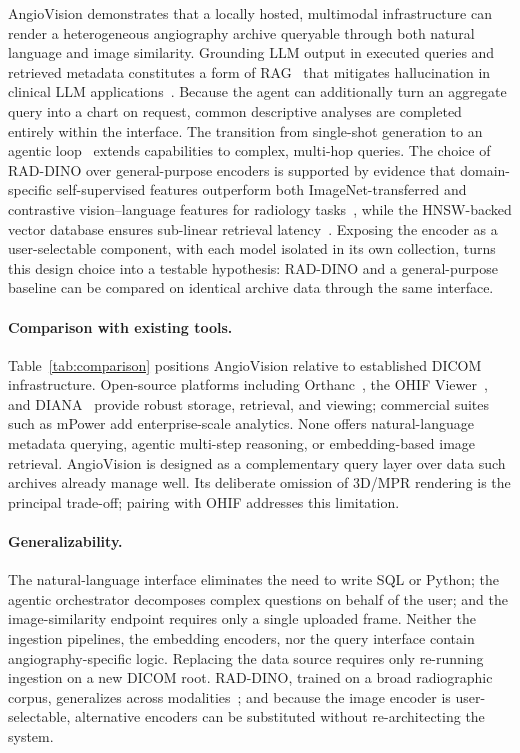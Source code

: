 \documentclass[11pt]{article}
\begin{document}
AngioVision demonstrates that a locally hosted, multimodal infrastructure can
render a heterogeneous angiography archive queryable through both natural
language and image similarity. Grounding LLM output in executed queries and
retrieved metadata constitutes a form of
RAG~\cite{lewis2020rag} that mitigates hallucination in clinical LLM
applications~\cite{thirunavukarasu2023llmmed,weinert2025rag}. Because the agent
can additionally turn an aggregate query into a chart on request, common
descriptive analyses are completed entirely within the interface. The transition
from single-shot generation to an agentic
loop~\cite{huggingface2025smolagents,yao2023react} extends capabilities to
complex, multi-hop queries. The choice of RAD-DINO over general-purpose
encoders is supported by evidence that domain-specific self-supervised features
outperform both ImageNet-transferred and contrastive vision--language features
for radiology tasks~\cite{perezgarcia2024raddino,ke2021chextransfer}, while
the HNSW-backed vector database ensures sub-linear retrieval
latency~\cite{malkov2020hnsw}. Exposing the encoder as a user-selectable
component, with each model isolated in its own collection, turns this design
choice into a testable hypothesis: RAD-DINO and a general-purpose baseline can be
compared on identical archive data through the same interface.

\paragraph{Comparison with existing tools.}
Table~\ref{tab:comparison} positions AngioVision relative to established DICOM
infrastructure. Open-source platforms including
Orthanc~\cite{jodogne2018orthanc}, the OHIF Viewer~\cite{ziegler2020ohif}, and
DIANA~\cite{yi2021diana} provide robust storage, retrieval, and viewing;
commercial suites such as mPower add enterprise-scale analytics. None offers
natural-language metadata querying, agentic multi-step reasoning, or
embedding-based image retrieval. AngioVision is designed as a complementary
query layer over data such archives already manage well. Its deliberate omission
of 3D/MPR rendering is the principal trade-off; pairing with OHIF
addresses this limitation.

\paragraph{Generalizability.}
The natural-language interface eliminates the need to write SQL or Python; the
agentic orchestrator decomposes complex questions on behalf of the user; and the
image-similarity endpoint requires only a single uploaded frame. Neither the
ingestion pipelines, the embedding encoders, nor the query interface contain
angiography-specific logic. Replacing the data source requires only re-running
ingestion on a new DICOM root. RAD-DINO, trained on a broad radiographic
corpus, generalizes across modalities~\cite{perezgarcia2024raddino}; and because
the image encoder is user-selectable, alternative encoders can be substituted
without re-architecting the system.
\end{document}
